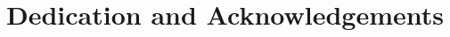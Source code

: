 \documentclass[ oneside,%
                    author={George Herbert},
                    degree={MSci},
                     title={Video Diffusion Models for Climate Simulations},
                  subtitle={}]{dissertation}
\begin{document}




\chapter*{Dedication and Acknowledgements}






\makedecl
\end{document}
